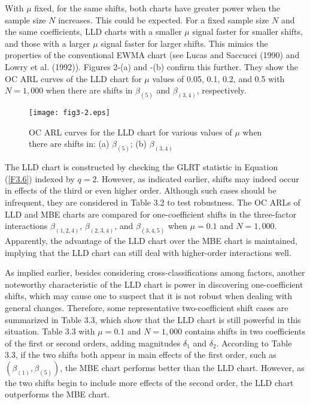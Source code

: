 With $\mu$ fixed, for the same shifts, both charts have greater power when the
sample size $N$ increases. This could be expected. For a fixed sample size $N$ and
the same coefficients, LLD charts with a smaller $\mu$ signal faster for smaller
shifts, and those with a larger $\mu$ signal faster for larger shifts. This mimics
the properties of the conventional EWMA chart (see Lucas and Saccucci (1990) and
Lowry et al. (1992)). Figures 2-(a) and -(b) confirm this further. They show the OC
ARL curves of the LLD chart for $\mu$ values of 0.05, 0.1, 0.2, and 0.5 with
$N=1,000$ when there are shifts in $\beta_{(5)}$ and $\beta_{(3,4)}$, respectively.

\begin{figure}[ht]
\begin{center}
\texttt{[image: fig3-2.eps]}
\vspace{-0.5cm} \caption{\small OC ARL curves for the LLD chart for various values
of $\mu$ when there are shifts in: (a) $\beta_{(5)}$; (b)
$\beta_{(3,4)}$}\vspace{-0.3cm}
\end{center}
\end{figure}

The LLD chart is constructed by checking the GLRT statistic in Equation (\ref{F3.6})
indexed by $q=2$. However, as indicated earlier, shifts may indeed occur in effects
of the third or even higher order. Although such cases should be infrequent, they
are considered in Table 3.2 to test robustness. The OC ARLs of LLD and MBE charts
are compared for one-coefficient shifts in the three-factor interactions
$\beta_{(1,2,4)}$, $\beta_{(2,3,4)}$, and $\beta_{(3,4,5)}$ when $\mu=0.1$ and
$N=1,000$. Apparently, the advantage of the LLD chart over the MBE chart is
maintained, implying that the LLD chart can still deal with higher-order
interactions well.

As implied earlier, besides considering cross-classifications among factors, another
noteworthy characteristic of the LLD chart is power in discovering one-coefficient
shifts, which may cause one to suspect that it is not robust when dealing with
general changes. Therefore, some representative two-coefficient shift cases are
summarized in Table 3.3, which show that the LLD chart is still powerful in this
situation. Table 3.3 with $\mu=0.1$ and $N=1,000$ contains shifts in two
coefficients of the first or second orders, adding magnitudes $\delta_1$ and
$\delta_2$. According to Table 3.3, if the two shifts both appear in main effects of
the first order, such as $(\beta_{(1)}, \beta_{(5)})$, the MBE chart performs better
than the LLD chart. However, as the two shifts begin to include more effects of the
second order, the LLD chart outperforms the MBE chart.

